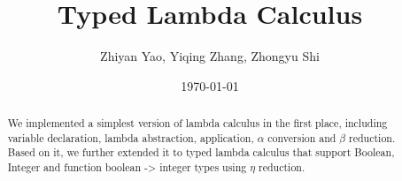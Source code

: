 \documentclass[12pt,a4paper]{article}
\title{Typed Lambda Calculus}
\author{Zhiyan Yao, Yiqing Zhang, Zhongyu Shi}
\date{\today}
\begin{document}
\maketitle

\begin{abstract}
We implemented a simplest version of lambda calculus in the first place, including variable declaration, lambda abstraction, application, $\alpha$ conversion and $\beta$ reduction. Based on it, we further extended it to typed lambda calculus that support Boolean, Integer and function boolean -> integer types using $\eta$ reduction. 

\end{abstract}

\vfill

\tableofcontents

\clearpage


% 









% 



\end{document}
